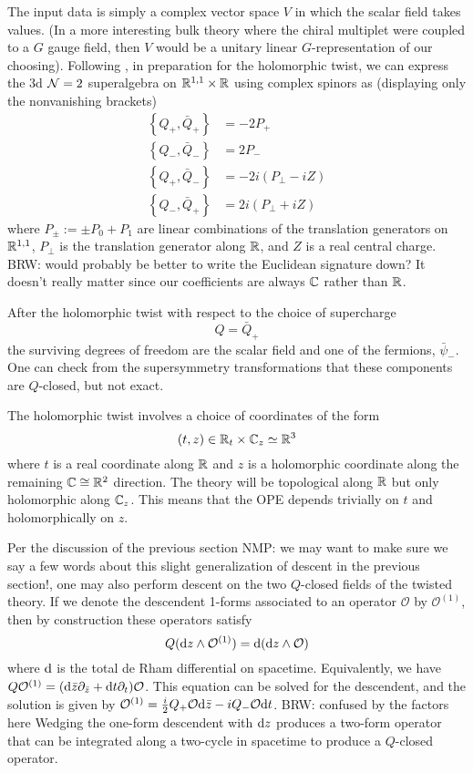 \documentclass[11pt]{amsart}
\def\brian#1{{\textcolor{blue!65!red}{BRW: {#1}}}}
\def\natalie#1{{\textcolor{green!65!black}{NMP: {#1}}}}
\begin{document}
The input data is simply a complex vector space $V$ in which the scalar field takes values. (In a more interesting bulk theory where the chiral multiplet were coupled to a $G$ gauge field, then $V$ would be a unitary linear $G$-representation of our choosing). Following \cite{DGP}, in preparation for the holomorphic twist, we can express the 3d $\mathcal N=2$ superalgebra on $\mathbb R^{1,1} \times \mathbb R$ using complex spinors as (displaying only the nonvanishing brackets)
\begin{align*}
\left\lbrace Q_+, \bar{Q}_+ \right\rbrace &= -2 P_+ \\
\left\lbrace Q_-, \bar{Q}_- \right\rbrace &= 2 P_- \\
\left\lbrace Q_+, \bar{Q}_- \right\rbrace &= -2 i (P_{\perp} - i Z) \\
\left\lbrace Q_-, \bar{Q}_+ \right\rbrace &= 2 i (P_{\perp} + i Z)
\end{align*} where $P_{\pm} := \pm P_0 + P_1$ are linear combinations of the translation generators on $\mathbb R^{1, 1}$, $P_{\perp}$ is the translation generator along $\mathbb R$, and $Z$ is a real central charge.
\brian{would probably be better to write the Euclidean signature down? It doesn't really matter since our coefficients are always $\mathbb C$ rather than $\mathbb R$.}

After the holomorphic twist with respect to the choice of supercharge 
\[
Q = \bar{Q}_+ 
\]
the surviving degrees of freedom are the scalar field and one of the fermions, $\bar{\psi}_-$. 
One can check from the supersymmetry transformations that these components are $Q$-closed, but not exact. 

The holomorphic twist involves a choice of coordinates of the form
\[
(t , z) \in \mathbb R_t \times \mathbb C_z \simeq \mathbb R^3
\]
where $t$ is a real coordinate along $\mathbb R$ and $z$ is a holomorphic coordinate along the remaining $\mathbb C \cong \mathbb R^2$ direction. 
The theory will be topological along $\mathbb R$ but only holomorphic along $\mathbb C_z$. 
This means that the OPE depends trivially on $t$ and holomorphically on $z$. 

Per the discussion of the previous section \natalie{we may want to make sure we say a few words about this slight generalization of descent in the previous section!}, one may also perform descent on the two $Q$-closed fields of the twisted theory. 
If we denote the descendent 1-forms associated to an operator $\mathcal{O}$ by $\mathcal{O}^{(1)}$, then by construction these operators satisfy
\[
Q({\rm d} z \wedge \mathcal{O}^{(1)}) = {\rm d} ({\rm d} z \wedge \mathcal{O})
\]
where ${\rm d}$ is the total de Rham differential on spacetime. Equivalently, we have $Q \mathcal{O}^{(1)} = ({\rm d} \bar{z}\partial_{\bar{z}} + {\rm d} t \partial_t)\mathcal{O}$. 
This equation can be solved for the descendent, and the solution is given by $\mathcal{O}^{(1)} = {i \over 2}Q_+ \mathcal{O} {\rm d}\bar{z} - i Q_- \mathcal{O} {\rm d} t$. 
\brian{confused by the factors here}
Wedging the one-form descendent with ${\rm d} z$ produces a two-form operator that can be integrated along a two-cycle in spacetime to produce a $Q$-closed operator. 
\end{document}
